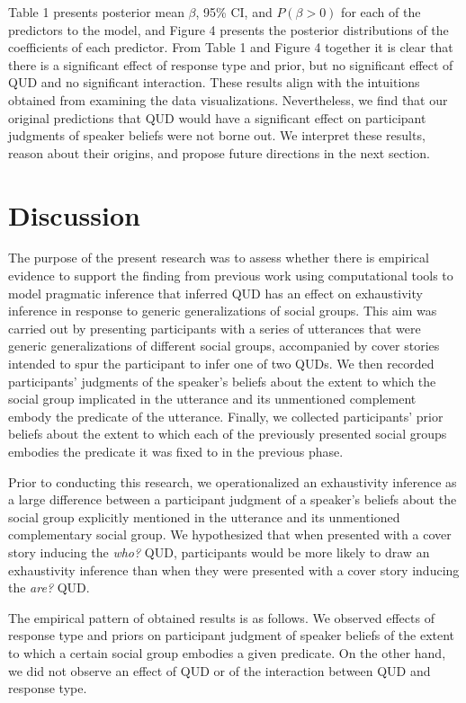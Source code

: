 \documentclass[11pt,a4paper]{article}
\begin{document}
Table 1 presents posterior mean $\beta$, 95\% CI, and $P(\beta > 0)$ for each of the predictors to the model, and Figure 4 presents the posterior distributions of the coefficients of each predictor. From Table 1 and Figure 4 together it is clear that there is a significant effect of response type and prior, but no significant effect of QUD and no significant interaction. These results align with the intuitions obtained from examining the data visualizations. Nevertheless, we find that our original predictions that QUD would have a significant effect on participant judgments of speaker beliefs were not borne out. We interpret these results, reason about their origins, and propose future directions in the next section. 

\section{Discussion}

The purpose of the present research was to assess whether there is empirical evidence to support the finding from previous work using computational tools to model pragmatic inference that inferred QUD has an effect on exhaustivity inference in response to generic generalizations of social groups. This aim was carried out by presenting participants with a series of utterances that were generic generalizations of different social groups, accompanied by cover stories intended to spur the participant to infer one of two QUDs. We then recorded participants' judgments of the speaker's beliefs about the extent to which the social group implicated in the utterance and its unmentioned complement embody the predicate of the utterance. Finally, we collected participants' prior beliefs about the extent to which each of the previously presented social groups embodies the predicate it was fixed to in the previous phase. 

Prior to conducting this research, we operationalized an exhaustivity inference as a large difference between a participant judgment of a speaker's beliefs about the social group explicitly mentioned in the utterance and its unmentioned complementary social group. We hypothesized that when presented with a cover story inducing the \textit{who?} QUD, participants would be more likely to draw an exhaustivity inference than when they were presented with a cover story inducing the \textit{are?} QUD. 

The empirical pattern of obtained results is as follows. We observed effects of response type and priors on participant judgment of speaker beliefs of the extent to which a certain social group embodies a given predicate. On the other hand, we did not observe an effect of QUD or of the interaction between QUD and response type. 
\end{document}
